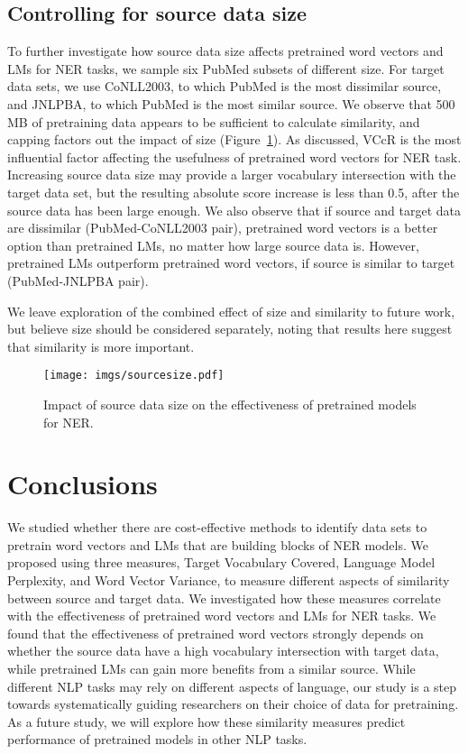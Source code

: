 \documentclass[11pt,a4paper]{article}
\begin{document}
\subsection{Controlling for source data size\label{section:size}}
To further investigate how source data size affects pretrained word vectors and LMs for NER tasks, we sample six PubMed subsets of different size. 
For target data sets, we use CoNLL2003, to which PubMed is the most dissimilar source, and JNLPBA, to which PubMed is the most similar source. 
We observe that 500 MB of pretraining data appears to be sufficient to calculate similarity, and capping factors out the impact of size (Figure~\ref{fig:impact-of-size}). 
As discussed, VCcR is the most influential factor affecting the usefulness of pretrained word vectors for NER task. 
Increasing source data size may provide a larger vocabulary intersection with the target data set, but the resulting absolute  score increase is less than 0.5, after the source data has been large enough. 
We also observe that if source and target data are dissimilar (PubMed-CoNLL2003 pair), pretrained word vectors is a better option than pretrained LMs, no matter how large source data is. 
However, pretrained LMs outperform pretrained word vectors, if source is similar to target (PubMed-JNLPBA pair). 

We leave exploration of the combined effect of size and similarity to future work, but believe size should be considered separately, noting that results here suggest that similarity is more important.


\begin{figure}[pt!]
    \centering
    \texttt{[image: imgs/sourcesize.pdf]}
    \caption{Impact of source data size on the effectiveness of pretrained models for NER.}\label{fig:impact-of-size}
\end{figure}



\section{Conclusions}
We studied whether there are cost-effective methods to identify data sets to pretrain word vectors and LMs that are building blocks of NER models. 
We proposed using three measures, Target Vocabulary Covered, Language Model Perplexity, and Word Vector Variance, to measure different aspects of similarity between source and target data. 
We investigated how these measures correlate with the effectiveness of pretrained word vectors and LMs for NER tasks. 
We found that the effectiveness of pretrained word vectors strongly depends on whether the source data have a high vocabulary intersection with target data, while pretrained LMs can gain more benefits from a similar source. 
While different NLP tasks may rely on different aspects of language, our study is a step towards systematically guiding researchers on their choice of data for pretraining. 
As a future study, we will explore how these similarity measures predict performance of pretrained models in other NLP tasks.
 
\end{document}
